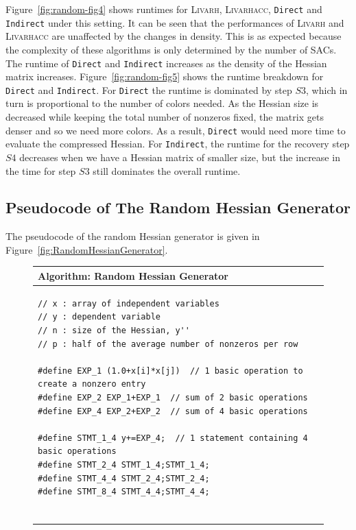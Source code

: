 \documentclass[12pt]{article}
\begin{document}
{Figure~\ref{fig:random-fig4} shows runtimes for \textsc{Livarh}, \textsc{Livarhacc},
{\tt Direct} and {\tt Indirect} under this setting. 
It can be seen that the performances of \textsc{Livarh} and \textsc{Livarhacc} 
are unaffected by the changes in density. This is as expected because the complexity of these
algorithms is only determined by the number of SACs. The runtime of {\tt Direct} and {\tt Indirect} increases as the density of the Hessian matrix increases. Figure~\ref{fig:random-fig5} shows the runtime breakdown for {\tt Direct} and {\tt Indirect}. For {\tt Direct} the runtime 
is dominated by step $S3$, which in turn is proportional to the number of colors needed. As the Hessian size is decreased while keeping the total number of nonzeros fixed, the matrix gets denser and so we need more colors. As a result, {\tt Direct} would need more time to evaluate the compressed Hessian. For {\tt Indirect}, the runtime for the recovery step $S4$ decreases when we have a Hessian matrix of smaller size, but the increase in the time for step $S3$ still dominates the overall runtime.

\subsection{Pseudocode of The Random Hessian Generator}
\label{sec-random-code}

The pseudocode of the random Hessian generator is given in Figure~\ref{fig:RandomHessianGenerator}.

\begin{figure}
\begin{center}
\begin{tabular*}{\textwidth}{l}
\hline
\textbf{Algorithm:} Random Hessian Generator \\  
\hline
\begin{minipage}{3in}
\begin{verbatim}
// x : array of independent variables
// y : dependent variable
// n : size of the Hessian, y''
// p : half of the average number of nonzeros per row

#define EXP_1 (1.0+x[i]*x[j])  // 1 basic operation to create a nonzero entry
#define EXP_2 EXP_1+EXP_1  // sum of 2 basic operations
#define EXP_4 EXP_2+EXP_2  // sum of 4 basic operations

#define STMT_1_4 y+=EXP_4;  // 1 statement containing 4 basic operations
#define STMT_2_4 STMT_1_4;STMT_1_4;
#define STMT_4_4 STMT_2_4;STMT_2_4;
#define STMT_8_4 STMT_4_4;STMT_4_4;


\end{verbatim}
\end{minipage}
\end{tabular*}
\end{center}
\end{figure}}
\end{document}
